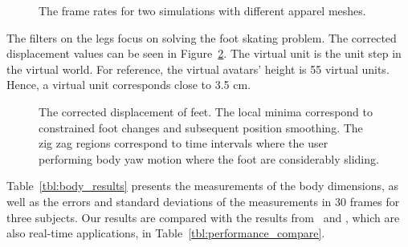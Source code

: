 \documentclass[number,preprint,review,12pt]{elsarticle}
\begin{document}
\begin{figure}[htbp]
{\color{red}
	\begin{center} 
	\end{center}
	\caption{The frame rates for two simulations with different apparel meshes. }
	\label{fig:fps}
}
\end{figure}


{\color{red}
The filters on the legs focus on solving the foot skating problem. The corrected displacement values can be seen in Figure~\ref{fig:footskating}. The virtual unit is the unit step in the virtual world. For reference, the virtual avatars' height is 55 virtual units. Hence, a virtual unit corresponds close to 3.5 cm.  
}


\begin{figure}[htbp] 
{\color{red}
	\begin{center} 
	\end{center}
	\caption{The corrected displacement of feet. The local minima correspond to constrained foot changes and subsequent position smoothing. The zig zag regions correspond to time intervals where the user performing body yaw motion where the foot are considerably sliding.}
	\label{fig:footskating}
}
\end{figure}


Table~\ref{tbl:body_results} presents the measurements of the body dimensions, as well as the errors and standard deviations of the measurements in 30 frames for three subjects. Our results are compared with the results from~\cite{Giovanni2012} and \cite{Samejima2012}, which are also real-time applications, in Table~\ref{tbl:performance_compare}.
\end{document}
